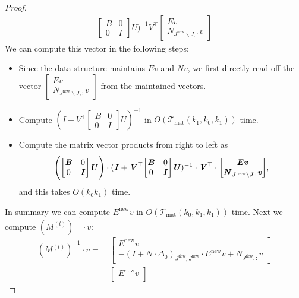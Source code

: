 \documentclass[11pt]{article}
\newcommand{\Tmat}{\mathcal{T}_{\mathrm{mat}}}
\newcommand{\new}{\mathrm{new}}
\let\originalleft\left
\let\originalright\right
\renewcommand{\left}{\mathopen{}\mathclose\bgroup\originalleft}
\renewcommand{\right}{\aftergroup\egroup\originalright}
\newcommand\vv{\boldsymbol{\mathit{v}}}
\newcommand\BB{\boldsymbol{\mathit{B}}}
\newcommand\EE{\boldsymbol{\mathit{E}}}
\newcommand\II{\boldsymbol{\mathit{I}}}
\newcommand\NN{\boldsymbol{\mathit{N}}}
\newcommand\MM{\boldsymbol{\mathit{M}}}
\newcommand\UU{\boldsymbol{\mathit{U}}}
\newcommand\VV{\boldsymbol{\mathit{V}}}
\newcommand{\ov}{\overline}
\begin{document}
\begin{proof}
\begin{align*}
\begin{bmatrix}
\BB & 0 \\
0 & \II
\end{bmatrix} \UU)^{-1} \VV^{\top} \begin{bmatrix}
\EE \vv \\
\NN_{J^{\new}\backslash J,:} \vv
\end{bmatrix}
\end{align*}
We can compute this vector in the following steps:
\begin{itemize}
\item Since the data structure maintains $\EE \vv$ and $\NN \vv$, we first directly read off the vector $\begin{bmatrix}
\EE \vv \\
\NN_{J^{\new}\backslash J,:} \vv
\end{bmatrix}$ from the maintained vectors.
\item Compute $(\II + \VV^{\top} \begin{bmatrix}
\BB & 0 \\
0 & \II
\end{bmatrix} \UU)^{-1}$ in $O(\Tmat(k_1, k_0, k_1))$ time. 
\item Compute the matrix vector products from right to left as \[
\left(\begin{bmatrix}
\BB & 0 \\
0 & \II
\end{bmatrix} \UU \right) \cdot (\II + \VV^{\top} \begin{bmatrix}
\BB & 0 \\
0 & \II
\end{bmatrix} \UU)^{-1} \cdot \VV^{\top} \cdot \begin{bmatrix}
\EE \vv \\
\NN_{J^{\new}\backslash J,:} \vv
\end{bmatrix},
\]
and this takes $O(k_0 k_1)$ time.
\end{itemize}
In summary we can compute $\EE^{\new} \vv$ in $O(\Tmat(k_0, k_1, k_1))$ time. Next we compute $(\MM^{(t)})^{-1} \cdot \vv$:
\begin{align*}
(\MM^{(t)})^{-1} \cdot \vv = &~ \begin{bmatrix}
\EE^{\new} \vv \\
- (\II + \NN \cdot \Delta_0)_{\overline{J^{\new}},J^{\new}} \cdot \EE^{\new} \vv + \NN_{\ov{J^{\new}}, :} \vv
\end{bmatrix} \\
= &~ \begin{bmatrix}
\EE^{\new} \vv \\

\end{bmatrix}
\end{align*}
\end{proof}
\end{document}
